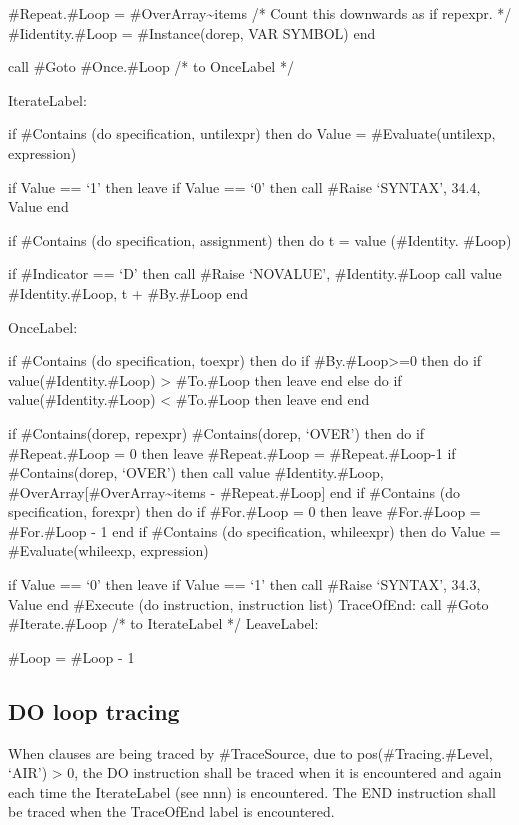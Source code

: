 \#Repeat.\#Loop = \#OverArray\textasciitilde items /* Count this
downwards as if repexpr. */ \#Iidentity.\#Loop = \#Instance(dorep, VAR
SYMBOL) end

call \#Goto \#Once.\#Loop /* to OnceLabel */

IterateLabel:

if \#Contains (do specification, untilexpr) then do Value =
\#Evaluate(untilexp, expression)

if Value == `1' then leave if Value == `0' then call \#Raise `SYNTAX',
34.4, Value end

if \#Contains (do specification, assignment) then do t = value
(\#Identity. \#Loop)

if \#Indicator == `D' then call \#Raise `NOVALUE', \#Identity.\#Loop
call value \#Identity.\#Loop, t + \#By.\#Loop end

OnceLabel:

if \#Contains (do specification, toexpr) then do if
\#By.\#Loop\textgreater=0 then do if value(\#Identity.\#Loop)
\textgreater{} \#To.\#Loop then leave end else do if
value(\#Identity.\#Loop) \textless{} \#To.\#Loop then leave end end

if \#Contains(dorep, repexpr) \textbar{} \#Contains(dorep, `OVER') then
do if \#Repeat.\#Loop = 0 then leave \#Repeat.\#Loop = \#Repeat.\#Loop-1
if \#Contains(dorep, `OVER') then call value \#Identity.\#Loop,
\#OverArray{[}\#OverArray\textasciitilde items - \#Repeat.\#Loop{]} end
if \#Contains (do specification, forexpr) then do if \#For.\#Loop = 0
then leave \#For.\#Loop = \#For.\#Loop - 1 end if \#Contains (do
specification, whileexpr) then do Value = \#Evaluate(whileexp,
expression)

if Value == `0' then leave if Value == `1' then call \#Raise `SYNTAX',
34.3, Value end \#Execute (do instruction, instruction list) TraceOfEnd:
call \#Goto \#Iterate.\#Loop /* to IterateLabel */ LeaveLabel:

\#Loop = \#Loop - 1

\hypertarget{do-loop-tracing}{%
\subsection{DO loop tracing}\label{do-loop-tracing}}

When clauses are being traced by \#TraceSource, due to
pos(\#Tracing.\#Level, `AIR') \textgreater{} 0, the DO instruction shall
be traced when it is encountered and again each time the IterateLabel
(see nnn) is encountered. The END instruction shall be traced when the
TraceOfEnd label is encountered.

